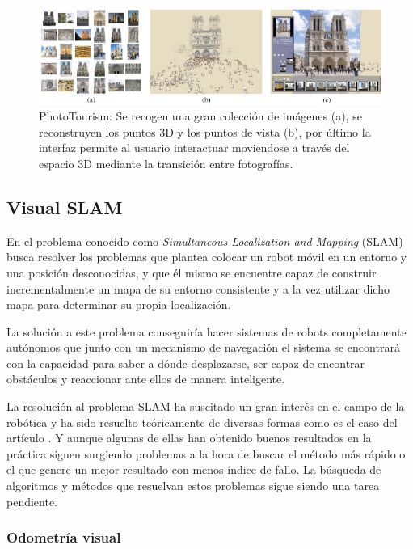 \begin{figure}[th]
\centering
\includegraphics[scale=0.57]{Figures/phototourism.png}
\decoRule
\caption[PhotoTourism]{PhotoTourism: Se recogen una gran colección de imágenes (a), se reconstruyen los puntos 3D y los puntos de vista (b), por último la interfaz permite al usuario interactuar moviendose a través del espacio 3D mediante la transición entre fotografías.}
\label{fig:Tourism}
\end{figure}

\subsection{Visual SLAM}

En el problema conocido como \textit{Simultaneous Localization and Mapping} (SLAM) busca resolver los problemas que plantea colocar un robot móvil en un entorno y una posición desconocidas, y que él mismo se encuentre capaz de construir incrementalmente un mapa de su entorno consistente y a la vez utilizar dicho mapa para determinar su propia localización.

La solución a este problema conseguiría hacer sistemas de robots completamente autónomos que junto con un mecanismo de navegación el sistema se encontrará con la capacidad para saber a dónde desplazarse, ser capaz de encontrar obstáculos y reaccionar ante ellos de manera inteligente.

La resolución al problema SLAM ha suscitado un gran interés en el campo de la robótica y ha sido resuelto teóricamente de diversas formas como es el caso del artículo \parencite{Reference1}. Y aunque algunas de ellas han obtenido buenos resultados en la práctica siguen surgiendo problemas a la hora de buscar el método más rápido o el que genere un mejor resultado con menos índice de fallo. La búsqueda de algoritmos y métodos que resuelvan estos problemas sigue siendo una tarea pendiente.

\subsubsection{Odometría visual}

